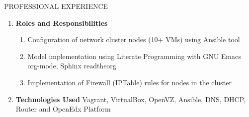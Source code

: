 \documentclass{resume} %
\newcommand{\blank}[1]{\hspace*{#1}}
\begin{document}
\begin{rSection}{PROFESSIONAL EXPERIENCE}
\begin{rSubsection}
\begin{enumerate}[label=\bfseries\arabic*]
\begin{enumerate}
  \item \textbf{Roles and Responsibilities }
    \begin{enumerate}
    \item Configuration of network cluster nodes (10+
      VMs) using Ansible tool
    \item Model implementation using Literate Programming with GNU Emacs
      org-mode, Sphinx readtheorg
    \item Implementation of Firewall (IPTable) rules for nodes in the
      cluster
    \end{enumerate}
    
    
  \item \textbf{Technologies Used } Vagrant, VirtualBox, OpenVZ,
    Ansible, DNS, DHCP, Router and OpenEdx Platform

  \end{enumerate}



\end{enumerate}
\end{rSubsection}
\end{rSection}
\end{document}
